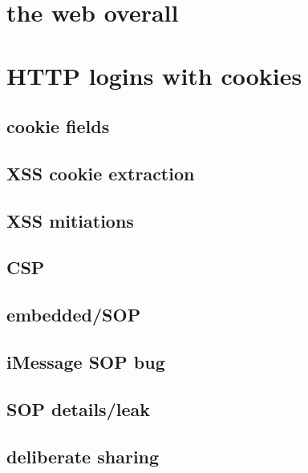 
\usetikzlibrary{arrows.meta,calc,shapes.callouts,positioning}

\section{the web overall}


%
\section{HTTP logins with cookies}


\subsection{cookie fields}


\subsection{XSS cookie extraction}


\subsection{XSS mitiations}


\subsection{CSP}


\subsection{embedded/SOP}


\subsection{iMessage SOP bug}


\subsection{SOP details/leak}


\subsection{deliberate sharing}


